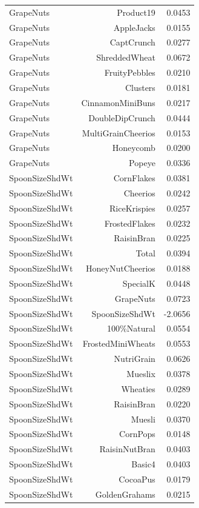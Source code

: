 \begin{longtable}{@{}lrr@{}}
GrapeNuts & Product19 & 0.0453 \\
GrapeNuts & AppleJacks & 0.0155 \\
GrapeNuts & CaptCrunch & 0.0277 \\
GrapeNuts & ShreddedWheat & 0.0672 \\
GrapeNuts & FruityPebbles & 0.0210 \\
GrapeNuts & Clusters & 0.0181 \\
GrapeNuts & CinnamonMiniBuns & 0.0217 \\
GrapeNuts & DoubleDipCrunch & 0.0444 \\
GrapeNuts & MultiGrainCheerios & 0.0153 \\
GrapeNuts & Honeycomb & 0.0200 \\
GrapeNuts & Popeye & 0.0336 \\
SpoonSizeShdWt & CornFlakes & 0.0381 \\
SpoonSizeShdWt & Cheerios & 0.0242 \\
SpoonSizeShdWt & RiceKrispies & 0.0257 \\
SpoonSizeShdWt & FrostedFlakes & 0.0232 \\
SpoonSizeShdWt & RaisinBran & 0.0225 \\
SpoonSizeShdWt & Total & 0.0394 \\
SpoonSizeShdWt & HoneyNutCheerios & 0.0188 \\
SpoonSizeShdWt & SpecialK & 0.0448 \\
SpoonSizeShdWt & GrapeNuts & 0.0723 \\
SpoonSizeShdWt & SpoonSizeShdWt & -2.0656 \\
SpoonSizeShdWt & 100\%Natural & 0.0554 \\
SpoonSizeShdWt & FrostedMiniWheats & 0.0553 \\
SpoonSizeShdWt & NutriGrain & 0.0626 \\
SpoonSizeShdWt & Mueslix & 0.0378 \\
SpoonSizeShdWt & Wheaties & 0.0289 \\
SpoonSizeShdWt & RaisinBran & 0.0220 \\
SpoonSizeShdWt & Muesli & 0.0370 \\
SpoonSizeShdWt & CornPops & 0.0148 \\
SpoonSizeShdWt & RaisinNutBran & 0.0403 \\
SpoonSizeShdWt & Basic4 & 0.0403 \\
SpoonSizeShdWt & CocoaPus & 0.0179 \\
SpoonSizeShdWt & GoldenGrahams & 0.0215 \\

\end{longtable}
